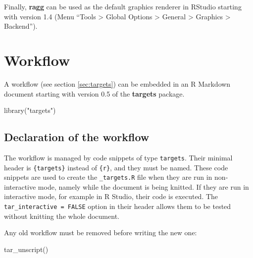 \documentclass[
  12pt,
  american,
  a4paper,
  extrafontsizes,onecolumn,openright
  ]{memoir}
\newenvironment{Shaded}{\begin{snugshade}}{\end{snugshade}}
\newcommand{\FunctionTok}[1]{\textcolor[rgb]{0.00,0.00,0.00}{#1}}
\newcommand{\NormalTok}[1]{#1}
\newcommand{\StringTok}[1]{\textcolor[rgb]{0.31,0.60,0.02}{#1}}
\begin{document}
\normalsize

Finally, \textbf{ragg} can be used as the default graphics renderer in RStudio starting with version 1.4 (Menu \enquote{Tools \textgreater{} Global Options \textgreater{} General \textgreater{} Graphics \textgreater{} Backend}).

\hypertarget{sec:targetsmd}{%
\section{Workflow}\label{sec:targetsmd}}

A workflow (see section \ref{sec:targets}) can be embedded in an R Markdown document starting with version 0.5 of the \textbf{targets} package.

\scriptsize

\begin{Shaded}
\begin{Highlighting}[]
\FunctionTok{library}\NormalTok{(}\StringTok{"targets"}\NormalTok{)}
\end{Highlighting}
\end{Shaded}

\normalsize

\hypertarget{declaration-of-the-workflow}{%
\subsection{Declaration of the workflow}\label{declaration-of-the-workflow}}

The workflow is managed by code snippets of type \texttt{targets}.
Their minimal header is \texttt{\{targets\}} instead of \texttt{\{r\}}, and they must be named.
These code snippets are used to create the \texttt{\_targets.R} file when they are run in non-interactive mode, namely while the document is being knitted.
If they are run in interactive mode, for example in R Studio, their code is executed.
The \texttt{tar\_interactive\ =\ FALSE} option in their header allows them to be tested without knitting the whole document.

Any old workflow must be removed before writing the new one:

\scriptsize

\begin{Shaded}
\begin{Highlighting}[]
\FunctionTok{tar\_unscript}\NormalTok{()}
\end{Highlighting}
\end{Shaded}

\normalsize
\end{document}
